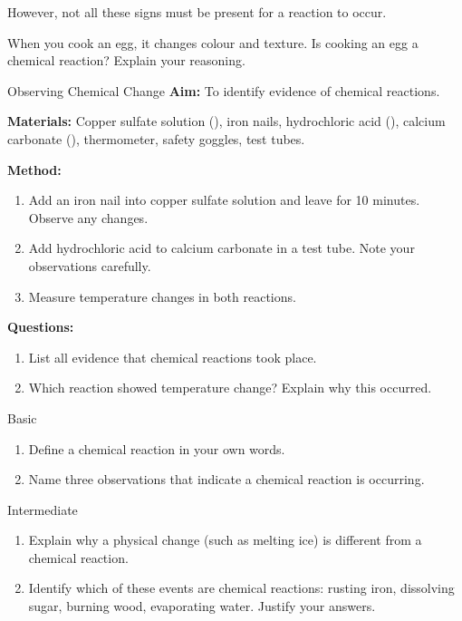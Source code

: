 However, not all these signs must be present for a reaction to occur.

\begin{stopandthink}
When you cook an egg, it changes colour and texture. Is cooking an egg a chemical reaction? Explain your reasoning.
\end{stopandthink}

\begin{investigation}{Observing Chemical Change}
\textbf{Aim:} To identify evidence of chemical reactions.

\textbf{Materials:} Copper sulfate solution (), iron nails, hydrochloric acid (), calcium carbonate (), thermometer, safety goggles, test tubes.

\textbf{Method:}
\begin{enumerate}
    \item Add an iron nail into copper sulfate solution and leave for 10 minutes. Observe any changes.
    \item Add hydrochloric acid to calcium carbonate in a test tube. Note your observations carefully.
    \item Measure temperature changes in both reactions.
\end{enumerate}

\textbf{Questions:}
\begin{enumerate}
    \item List all evidence that chemical reactions took place.
    \item Which reaction showed temperature change? Explain why this occurred.
\end{enumerate}

\end{investigation}

\begin{tieredquestions}{Basic}
\begin{enumerate}
    \item Define a chemical reaction in your own words.
    \item Name three observations that indicate a chemical reaction is occurring.
\end{enumerate}
\end{tieredquestions}

\begin{tieredquestions}{Intermediate}
\begin{enumerate}
    \item Explain why a physical change (such as melting ice) is different from a chemical reaction.
    \item Identify which of these events are chemical reactions: rusting iron, dissolving sugar, burning wood, evaporating water. Justify your answers.
\end{enumerate}
\end{tieredquestions}

